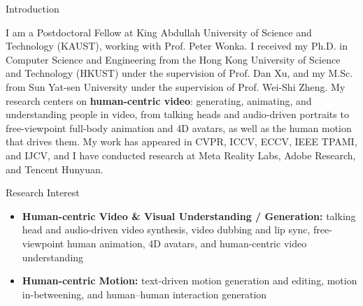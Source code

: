 \documentclass{resume} %
\begin{document}

\begin{rSection}{Introduction}

\begin{itemize}[leftmargin=10pt]
\setlength{\itemsep}{-5pt}
I am a Postdoctoral Fellow at King Abdullah University of Science and Technology (KAUST), working with Prof. Peter Wonka. I received my Ph.D. in Computer Science and Engineering from the Hong Kong University of Science and Technology (HKUST) under the supervision of Prof. Dan Xu, and my M.Sc. from Sun Yat-sen University under the supervision of Prof. Wei-Shi Zheng. My research centers on \textbf{human-centric video}: generating, animating, and understanding people in video, from talking heads and audio-driven portraits to free-viewpoint full-body animation and 4D avatars, as well as the human motion that drives them. My work has appeared in CVPR, ICCV, ECCV, IEEE TPAMI, and IJCV, and I have conducted research at Meta Reality Labs, Adobe Research, and Tencent Hunyuan.
\end{itemize}

\end{rSection}

\begin{rSection}{Research Interest}

\begin{itemize}[leftmargin=18pt]
    \setlength{\itemsep}{-3pt}
    \item {\color{topicVG}\bfseries Human-centric Video \& Visual Understanding / Generation:} talking head and audio-driven video synthesis, video dubbing and lip sync, free-viewpoint human animation, 4D avatars, and human-centric video understanding
    \item {\color{topicMO}\bfseries Human-centric Motion:} text-driven motion generation and editing, motion in-betweening, and human--human interaction generation
\end{itemize}

\end{rSection}
\end{document}
